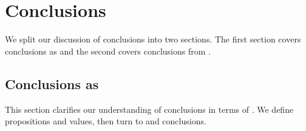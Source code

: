 \section{Conclusions}
\label{cha:clar:sec:Cons}

\begin{note}
  We split our discussion of conclusions into two sections.
  The first section covers conclusions as  and the second covers conclusions from .
\end{note}

\subsection{Conclusions as }
\label{cha:clar:sec:Cons:pvp}

\begin{note}
  This section clarifies our understanding of conclusions in terms of \evalN{}.
  We define propositions and values, then turn to  and conclusions.
\end{note}
%
